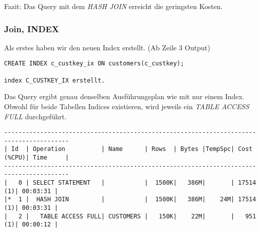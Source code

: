 \documentclass[11pt,a4paper,parskip=half]{scrartcl}
\begin{document}
Fazit: Das Query mit dem \emph{HASH JOIN} erreicht die geringsten Kosten.

\subsubsection{Join, INDEX}
Als erstes haben wir den neuen Index erstellt. (Ab Zeile 3 Output)
\begin{lstlisting}
CREATE INDEX c_custkey_ix ON customers(c_custkey);

index C_CUSTKEY_IX erstellt.
\end{lstlisting}

Das Query ergibt genau denselben Ausführungsplan wie mit nur einem Index. Obwohl für beide Tabellen Indices existieren, wird jeweils ein \emph{TABLE ACCESS FULL} durchgeführt.
\begin{lstlisting}
----------------------------------------------------------------------------------------                                                                                                                                                                                                                     
| Id  | Operation          | Name      | Rows  | Bytes |TempSpc| Cost (%CPU)| Time     |                                                                                                                                                                                                                     
----------------------------------------------------------------------------------------                                                                                                                                                                                                                     
|   0 | SELECT STATEMENT   |           |  1500K|   386M|       | 17514   (1)| 00:03:31 |                                                                                                                                                                                                                     
|*  1 |  HASH JOIN         |           |  1500K|   386M|    24M| 17514   (1)| 00:03:31 |                                                                                                                                                                                                                     
|   2 |   TABLE ACCESS FULL| CUSTOMERS |   150K|    22M|       |   951   (1)| 00:00:12 |                                                                                                                                                                                                                     

\end{lstlisting}
\end{document}
